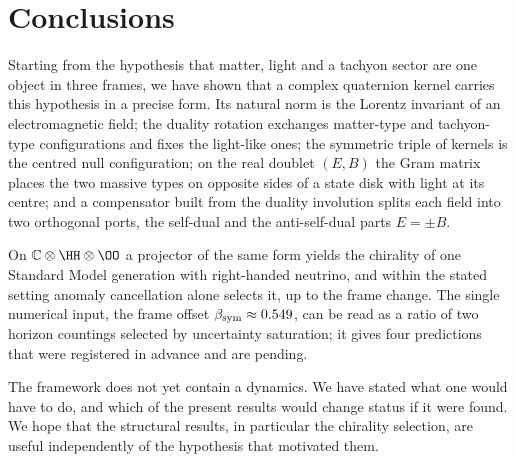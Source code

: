 \section{Conclusions}\label{sec:conclusions}

Starting from the hypothesis that matter, light and a tachyon sector are one object in three frames, we have shown that a complex
quaternion kernel carries this hypothesis in a precise form.  Its natural norm is the Lorentz invariant of an electromagnetic field; the
duality rotation exchanges matter-type and tachyon-type configurations and fixes the light-like ones; the symmetric triple of kernels is the
centred null configuration; on the real doublet \((E,B)\) the Gram matrix places the two massive types on opposite sides of a state disk with light at its centre;
and a compensator built from the duality involution splits each field into two orthogonal ports, the self-dual and the anti-self-dual
parts \(E=\pm B\).

On \(\mathbb C\otimes\HH\otimes\OO\) a projector of the same form yields the chirality of one Standard Model generation with right-handed
neutrino, and within the stated setting anomaly cancellation alone selects it, up to the frame change.  The single numerical input, the
frame offset \(\beta_{\rm sym}\approx0.549\), can be read as a ratio of two horizon countings selected by uncertainty saturation; it gives four
predictions that were registered in advance and are pending.

The framework does not yet contain a dynamics.  We have stated what one would have to do, and which of the present results would change
status if it were found.  We hope that the structural results, in particular the chirality selection, are useful independently of the
hypothesis that motivated them.
